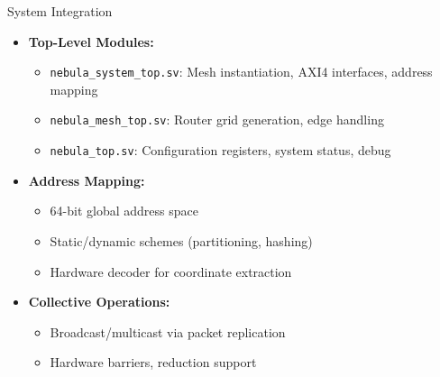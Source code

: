 \documentclass{beamer}
\begin{document}
\begin{frame}{System Integration}
  \begin{itemize}
    \item \textbf{Top-Level Modules:}
      \begin{itemize}
        \item \texttt{nebula\_system\_top.sv}: Mesh instantiation, AXI4 interfaces, address mapping
        \item \texttt{nebula\_mesh\_top.sv}: Router grid generation, edge handling
        \item \texttt{nebula\_top.sv}: Configuration registers, system status, debug
      \end{itemize}
    \item \textbf{Address Mapping:}
      \begin{itemize}
        \item 64-bit global address space
        \item Static/dynamic schemes (partitioning, hashing)
        \item Hardware decoder for coordinate extraction
      \end{itemize}
    \item \textbf{Collective Operations:}
      \begin{itemize}
        \item Broadcast/multicast via packet replication
        \item Hardware barriers, reduction support
      \end{itemize}
  \end{itemize}
\end{frame}
\end{document}
